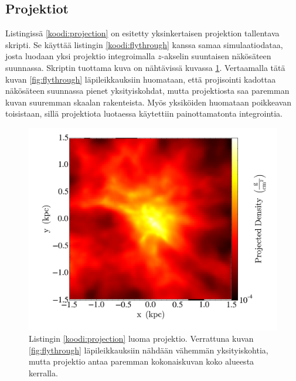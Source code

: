 \documentclass[12pt,a4paper]{article}
\begin{document}
\subsection{Projektiot}

Listingissä \ref{koodi:projection} on esitetty yksinkertaisen projektion tallentava skripti. Se käyttää listingin \ref{koodi:flythrough} kanssa samaa simulaatiodataa, josta luodaan yksi projektio integroimalla $z$-akselin suuntaisen näkösäteen suunnassa. Skriptin tuottama kuva on nähtävissä kuvassa \ref{fig:projection}. Vertaamalla tätä kuvan \ref{fig:flythrough} läpileikkauksiin huomataan, että projisointi kadottaa näkösäteen suunnassa pienet yksityiskohdat, mutta projektiosta saa paremman kuvan suuremman skaalan rakenteista. Myös yksiköiden huomataan poikkeavan toisistaan, sillä projektiota luotaessa käytettiin painottamatonta integrointia.


\begin{minipage}{\linewidth}

\end{minipage}

\begin{figure}
   \centering
   \includegraphics[width=.7\textwidth]{../kuvat/projection.png}
   \caption{Listingin \ref{koodi:projection} luoma projektio. Verrattuna kuvan \ref{fig:flythrough} läpileikkauksiin nähdään vähemmän yksityiskohtia, mutta projektio antaa paremman kokonaiskuvan koko alueesta kerralla.} \label{fig:projection}
\end{figure}
\end{document}
